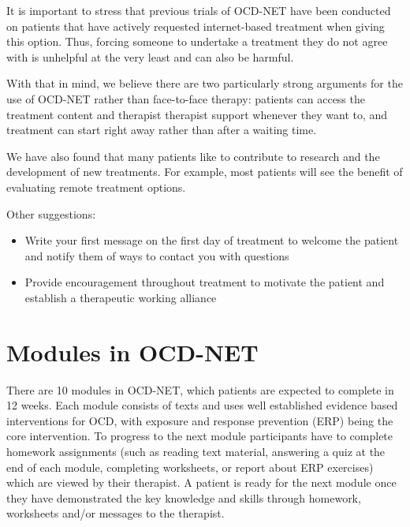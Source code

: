 \documentclass[]{book}
\providecommand{\tightlist}{%
  \setlength{\itemsep}{0pt}\setlength{\parskip}{0pt}}
\theoremstyle{definition}
\theoremstyle{definition}
\theoremstyle{definition}
\theoremstyle{remark}
\begin{document}
It is important to stress that previous trials of OCD-NET have been
conducted on patients that have actively requested internet-based
treatment when giving this option. Thus, forcing someone to undertake a
treatment they do not agree with is unhelpful at the very least and can
also be harmful.

With that in mind, we believe there are two particularly strong
arguments for the use of OCD-NET rather than face-to-face therapy:
patients can access the treatment content and therapist therapist
support whenever they want to, and treatment can start right away rather
than after a waiting time.

We have also found that many patients like to contribute to research and
the development of new treatments. For example, most patients will see
the benefit of evaluating remote treatment options.

Other suggestions:

\begin{itemize}
\tightlist
\item
  Write your first message on the first day of treatment to welcome the
  patient and notify them of ways to contact you with questions
\item
  Provide encouragement throughout treatment to motivate the patient and
  establish a therapeutic working alliance
\end{itemize}

\hypertarget{modules-in-ocd-net}{%
\section{Modules in OCD-NET}\label{modules-in-ocd-net}}

There are 10 modules in OCD-NET, which patients are expected to complete
in 12 weeks. Each module consists of texts and uses well established
evidence based interventions for OCD, with exposure and response
prevention (ERP) being the core intervention. To progress to the next
module participants have to complete homework assignments (such as
reading text material, answering a quiz at the end of each module,
completing worksheets, or report about ERP exercises) which are viewed
by their therapist. A patient is ready for the next module once they
have demonstrated the key knowledge and skills through homework,
worksheets and/or messages to the therapist.
\end{document}
